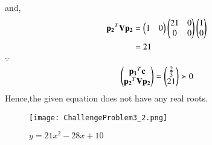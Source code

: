 \documentclass[journal,12pt,twocolumn]{IEEEtran}
\begin{document}
\begin{enumerate}
\begin{align}
    \end{align}
    and,
    \begin{align}
        \mathbf{p_2}^T\mathbf{V}\mathbf{p_2} &= \begin{pmatrix}1 & 0\end{pmatrix}\begin{pmatrix}21 & 0\\0& 0\end{pmatrix}\begin{pmatrix}1 \\ 0\end{pmatrix}
        \\
        &= 21
    \end{align}
    $\because$
    \begin{align}
    \begin{pmatrix}\mathbf{p_1}^T\mathbf{c} \\ \mathbf{p_2}^T\mathbf{V}\mathbf{p_2}\end{pmatrix} = \begin{pmatrix}\frac{2}{3} \\ 21\end{pmatrix} \succ 0
    \end{align}
    Hence,the given equation does not have any real roots.
    
    \begin{figure}[!ht]
    \centering
    \texttt{[image: ChallengeProblem3\_2.png]}
    \caption{$y=21x^2-28x+10$}
    \label{ex1}	
    \end{figure}
    

\end{enumerate}
\end{document}
